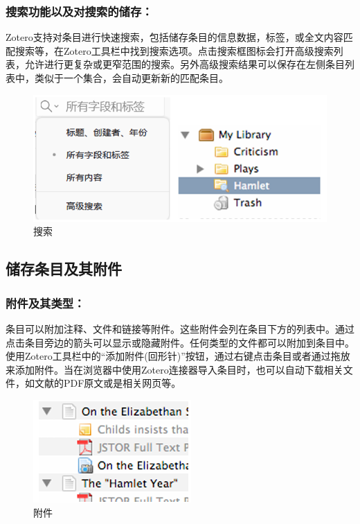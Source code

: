 \documentclass[]{ctexbook}
\theoremstyle{definition}
\theoremstyle{definition}
\theoremstyle{definition}
\theoremstyle{definition}
\theoremstyle{remark}
\begin{document}
\subsubsection{搜索功能以及对搜索的储存：}\label{ux641cux7d22ux529fux80fdux4ee5ux53caux5bf9ux641cux7d22ux7684ux50a8ux5b58}

Zotero支持对条目进行快速搜索，包括储存条目的信息数据，标签，或全文内容匹配搜索等，在Zotero工具栏中找到搜索选项。点击搜索框图标会打开高级搜索列表，允许进行更复杂或更窄范围的搜索。另外高级搜索结果可以保存在左侧条目列表中，类似于一个集合，会自动更新新的匹配条目。

\begin{figure}

{\centering \includegraphics[width=0.8\linewidth]{img/zotero/zotero_search} 

}

\caption{搜索}\label{fig:zotero-search}
\end{figure}

\subsection{储存条目及其附件}\label{ux50a8ux5b58ux6761ux76eeux53caux5176ux9644ux4ef6}

\subsubsection{附件及其类型：}\label{ux9644ux4ef6ux53caux5176ux7c7bux578b}

条目可以附加注释、文件和链接等附件。这些附件会列在条目下方的列表中。通过点击条目旁边的箭头可以显示或隐藏附件。任何类型的文件都可以附加到条目中。使用Zotero工具栏中的``添加附件(回形针)''按钮，通过右键点击条目或者通过拖放来添加附件。当在浏览器中使用Zotero连接器导入条目时，也可以自动下载相关文件，如文献的PDF原文或是相关网页等。

\begin{figure}

{\centering \includegraphics[width=0.4\linewidth]{img/zotero/zotero_attachment} 

}

\caption{附件}\label{fig:zotero-attachment}
\end{figure}
\end{document}
